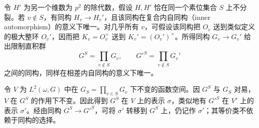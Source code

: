 令 $H'$ 为另一个维数为 $p^2$ 的除代数，假设 $H,H'$ 恰在同一个素位集合 $S$ 上不分裂。若
$v\notin S$，有同构 $H_v\to H_v'$，且该同构在复合内自同构（inner automorphism）的意义下唯一。对几乎所有 $v$，可假设该同构把 $O_v$ 送到类似定义的极大整环
$O_v'$，因而把 $K_v=O_v^\times$ 送到 $K_v'=(O_v')^\times$。所得同构 $G_v\to G_v'$ 给出限制直积群
\[
 G^S=\prod_{v\notin S}G_v,\qquad G'^S=\prod_{v\notin S}G_v'
\]
之间的同构，同样在相差内自同构的意义下唯一。

令 $V$ 为 $L^2(\omega,G)$ 中在 $G_S=\prod_{v\in S}G_v$ 下不变的函数空间。因
$G^S$ 与 $G_S$ 对易，$V$ 在 $G^S$ 的作用下不变。因此得到 $G^S$ 在 $V$ 上的表示
$\sigma$，类似地有 $G'^S$ 在 $V'$ 上的表示 $\sigma'$。经由同构 $G^S\to G'^S$，可将
$\sigma'$ 转移到 $G^S$ 上，仍记作 $\sigma'$；其等价类不依赖于同构的选择。

